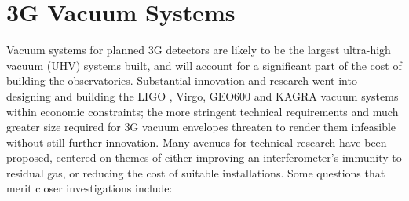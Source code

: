 \section{3G Vacuum Systems}
Vacuum systems for planned \ac{3G} detectors are likely to be the largest ultra-high vacuum (UHV) systems built, and will account for a significant part of the cost of building the observatories. Substantial innovation and research went into designing and building the \ac{LIGO} , Virgo, GEO600 and \ac{KAGRA}  vacuum systems within economic constraints; the more stringent technical requirements and much greater size required for \ac{3G} vacuum envelopes threaten to render them infeasible without still further innovation. Many avenues for technical research have been proposed,  centered on themes of either improving an interferometer’s immunity to residual gas, or reducing the cost of suitable installations. Some questions that merit closer investigations include:

